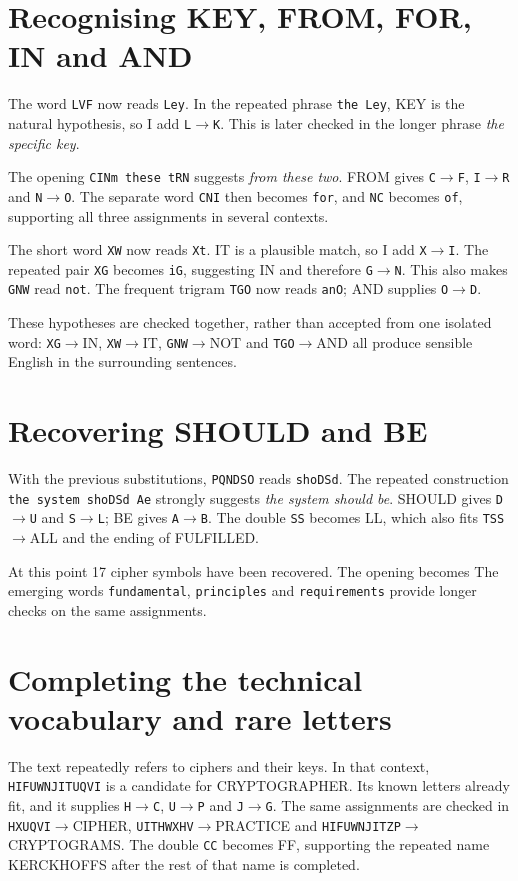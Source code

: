 \documentclass{tum_report}
\newcommand{\partialtext}[1]{{\setstretch{1}}}
\newcommand{\pair}[2]{\texttt{#1}$\to$\texttt{#2}}
\begin{document}
\clearpage
\section{Recognising KEY, FROM, FOR, IN and AND}
The word \texttt{LVF} now reads \texttt{Ley}. In the repeated phrase
\texttt{the Ley}, KEY is the natural hypothesis, so I add \pair{L}{K}.
This is later checked in the longer phrase \textit{the specific key}.

The opening \texttt{CINm these tRN} suggests \textit{from these two}.
FROM gives \pair{C}{F}, \pair{I}{R} and \pair{N}{O}. The separate word
\texttt{CNI} then becomes \texttt{for}, and \texttt{NC} becomes
\texttt{of}, supporting all three assignments in several contexts.
\partialtext{11}

The short word \texttt{XW} now reads \texttt{Xt}. IT is a plausible match,
so I add \pair{X}{I}. The repeated pair \texttt{XG} becomes \texttt{iG},
suggesting IN and therefore \pair{G}{N}. This also makes
\texttt{GNW} read \texttt{not}. The frequent trigram \texttt{TGO}
now reads \texttt{anO}; AND supplies \pair{O}{D}.

These hypotheses are checked together, rather than accepted from one
isolated word: \texttt{XG}$\to$IN, \texttt{XW}$\to$IT,
\texttt{GNW}$\to$NOT and \texttt{TGO}$\to$AND all produce sensible
English in the surrounding sentences.

\section{Recovering SHOULD and BE}
With the previous substitutions, \texttt{PQNDSO} reads \texttt{shoDSd}.
The repeated construction \texttt{the system shoDSd Ae} strongly suggests
\textit{the system should be}. SHOULD gives \pair{D}{U} and \pair{S}{L};
BE gives \pair{A}{B}. The double \texttt{SS} becomes LL, which also fits
\texttt{TSS}$\to$ALL and the ending of FULFILLED.

At this point 17 cipher symbols have been recovered. The opening becomes
\partialtext{17}
The emerging words \texttt{fundamental}, \texttt{principles} and
\texttt{requirements} provide longer checks on the same assignments.

\clearpage
\section{Completing the technical vocabulary and rare letters}
The text repeatedly refers to ciphers and their keys. In that context,
\texttt{HIFUWNJITUQVI} is a candidate for CRYPTOGRAPHER. Its known letters
already fit, and it supplies \pair{H}{C}, \pair{U}{P} and \pair{J}{G}.
The same assignments are checked in \texttt{HXUQVI}$\to$CIPHER,
\texttt{UITHWXHV}$\to$PRACTICE and \texttt{HIFUWNJITZP}$\to$CRYPTOGRAMS.
The double \texttt{CC} becomes FF, supporting the repeated name
KERCKHOFFS after the rest of that name is completed.
\end{document}
